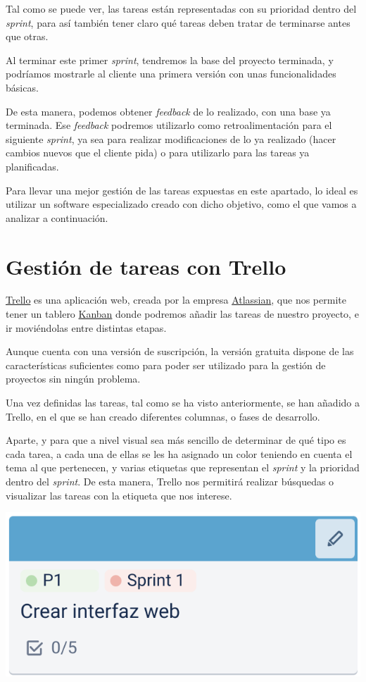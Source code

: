 \documentclass{\ClassPath/viu-tfm-template}
\begin{document}
Tal como se puede ver, las tareas están representadas con su prioridad dentro del \textit{sprint}, para así también tener claro qué tareas deben tratar de terminarse antes que otras.

Al terminar este primer \textit{sprint}, tendremos la base del proyecto terminada, y podríamos mostrarle al cliente una primera versión con unas funcionalidades básicas.

De esta manera, podemos obtener \textit{feedback} de lo realizado, con una base ya terminada. Ese \textit{feedback} podremos utilizarlo como retroalimentación para el siguiente \textit{sprint}, ya sea para realizar modificaciones de lo ya realizado (hacer cambios nuevos que el cliente pida) o para utilizarlo para las tareas ya planificadas.

Para llevar una mejor gestión de las tareas expuestas en este apartado, lo ideal es utilizar un software especializado creado con dicho objetivo, como el que vamos a analizar a continuación.

\section{Gestión de tareas con Trello}

\href{https://trello.com/}{Trello} es una aplicación web, creada por la empresa \href{https://www.atlassian.com/}{Atlassian}, que nos permite tener un tablero \href{https://en.wikipedia.org/wiki/Kanban_(development)}{Kanban} donde podremos añadir las tareas de nuestro proyecto, e ir moviéndolas entre distintas etapas.

Aunque cuenta con una versión de suscripción, la versión gratuita dispone de las características suficientes como para poder ser utilizado para la gestión de proyectos sin ningún problema.

Una vez definidas las tareas, tal como se ha visto anteriormente, se han añadido a Trello, en el que se han creado diferentes columnas, o fases de desarrollo.

Aparte, y para que a nivel visual sea más sencillo de determinar de qué tipo es cada tarea, a cada una de ellas se les ha asignado un color teniendo en cuenta el tema al que pertenecen, y varias etiquetas que representan el \textit{sprint} y la prioridad dentro del \textit{sprint}. De esta manera, Trello nos permitirá realizar búsquedas o visualizar las tareas con la etiqueta que nos interese.


\begin{center}
    \includegraphics[width=0.5\linewidth]{img/tarea.png}
\end{center}
\end{document}
